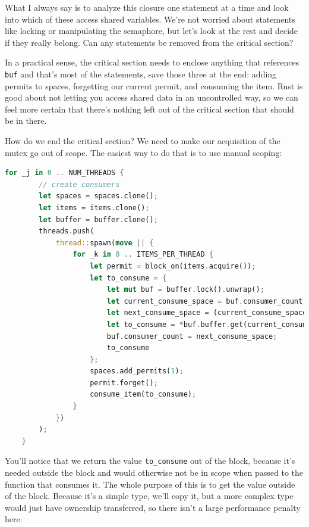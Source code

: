\documentclass[a4paper]{report}
\begin{document}
What I always say is to analyze this closure one statement at a time and look into which of these access shared variables. We're not worried about statements like locking or manipulating the semaphore, but let's look at the rest and decide if they really belong. Can any statements be removed from the critical section?

In a practical sense, the critical section needs to enclose anything that references \texttt{buf} and that's most of the statements, save those three at the end: adding permits to spaces, forgetting our current permit, and consuming the item. Rust is good about not letting you access shared data in an uncontrolled way, so we can feel more certain that there's nothing left out of the critical section that should be in there.

How do we end the critical section? We need to make our acquisition of the mutex go out of scope. The easiest way to do that is to use manual scoping:

\begin{lstlisting}[language=Rust]
    for _j in 0 .. NUM_THREADS {
        // create consumers
        let spaces = spaces.clone();
        let items = items.clone();
        let buffer = buffer.clone();
        threads.push(
            thread::spawn(move || {
                for _k in 0 .. ITEMS_PER_THREAD {
                    let permit = block_on(items.acquire());
                    let to_consume = {
                        let mut buf = buffer.lock().unwrap();
                        let current_consume_space = buf.consumer_count;
                        let next_consume_space = (current_consume_space + 1) % buf.buffer.len();
                        let to_consume = *buf.buffer.get(current_consume_space).unwrap();
                        buf.consumer_count = next_consume_space;
                        to_consume
                    };
                    spaces.add_permits(1);
                    permit.forget();
                    consume_item(to_consume);
                }
            })
        );
    }
\end{lstlisting}

You'll notice that we return the value \texttt{to\_consume} out of the block, because it's needed outside the block and would otherwise not be in scope when passed to the function that consumes it. The whole purpose of this is to get the value outside of the block. Because it's a simple type, we'll copy it, but a more complex type would just have ownership transferred, so there isn't a large performance penalty here.
\end{document}
